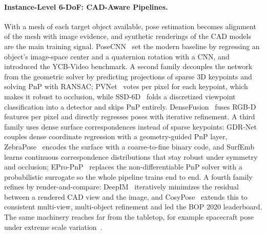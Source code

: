 \paragraph{Instance-Level 6-DoF: CAD-Aware Pipelines.}
With a mesh of each target object available, pose estimation becomes alignment of the mesh with image evidence, and synthetic renderings of the CAD models are the main training signal.
PoseCNN~\cite{xiang2017posecnn} set the modern baseline by regressing an object's image-space center and a quaternion rotation with a CNN, and introduced the YCB-Video benchmark.
A second family decouples the network from the geometric solver by predicting projections of sparse 3D keypoints and solving PnP with RANSAC; PVNet~\cite{peng2019pvnet} votes per pixel for each keypoint, which makes it robust to occlusion, while SSD-6D~\cite{kehl2017ssd6d} folds a discretized viewpoint classification into a detector and skips PnP entirely.
DenseFusion~\cite{Wang2019DenseFusion} fuses RGB-D features per pixel and directly regresses poses with iterative refinement. A third family uses dense surface correspondences instead of sparse keypoints: GDR-Net~\cite{wang2021gdrnet} couples dense coordinate regression with a geometry-guided PnP layer, ZebraPose~\cite{su2022zebrapose} encodes the surface with a coarse-to-fine binary code, and SurfEmb~\cite{haugaard2022surfemb} learns continuous correspondence distributions that stay robust under symmetry and occlusion; EPro-PnP~\cite{chen2022epro} replaces the non-differentiable PnP solver with a probabilistic surrogate so the whole pipeline trains end to end.
A fourth family refines by render-and-compare: DeepIM~\cite{li2018deepim} iteratively minimizes the residual between a rendered CAD view and the image, and CosyPose~\cite{Labbe2020CosyPose} extends this to consistent multi-view, multi-object refinement and led the BOP 2020 leaderboard.
The same machinery reaches far from the tabletop, for example spacecraft pose under extreme scale variation~\cite{hu2021widedepthrange}.

